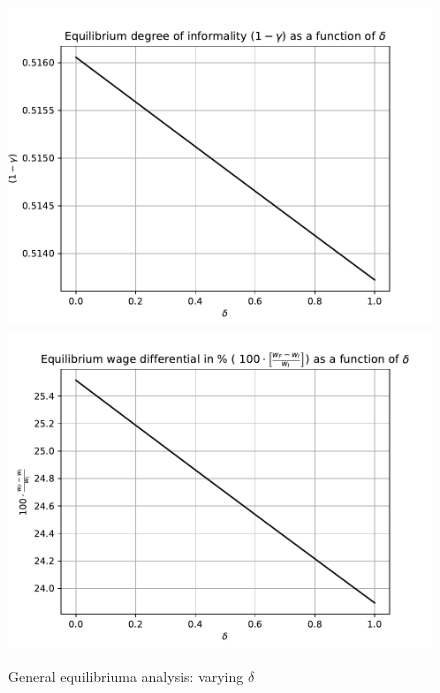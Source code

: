 \documentclass[12pt]{article}
\begin{document}
\begin{figure}
    \centering
     \caption{General equilibriuma analysis: varying $\delta$}
    \includegraphics[scale = 0.9]{figures/informality.pdf}
    \includegraphics[scale = 0.9]{figures/wagegap.pdf}

    \label{fig:gen_eq}
\end{figure}
\end{document}
